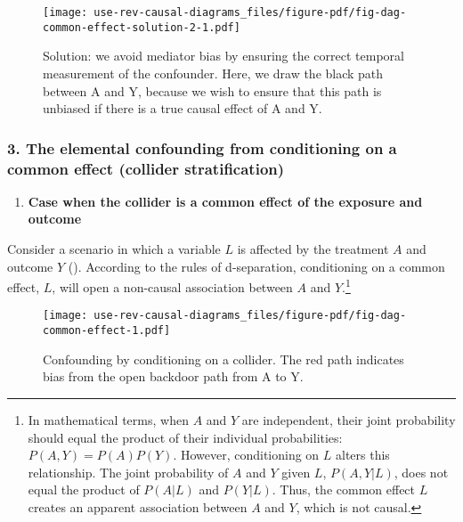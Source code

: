 \documentclass[
  singlecolumn,
  9pt]{article}
\providecommand{\tightlist}{%
  \setlength{\itemsep}{0pt}\setlength{\parskip}{0pt}}\usepackage{longtable,booktabs,array}
\begin{document}
\begin{figure}

{\centering \texttt{[image: use-rev-causal-diagrams\_files/figure-pdf/fig-dag-common-effect-solution-2-1.pdf]}

}

\caption{\label{fig-dag-common-effect-solution-2}Solution: we avoid
mediator bias by ensuring the correct temporal measurement of the
confounder. Here, we draw the black path between A and Y, because we
wish to ensure that this path is unbiased if there is a true causal
effect of A and Y.}

\end{figure}

\subsubsection{3. The elemental confounding from conditioning on a
common effect (collider
stratification)}\label{the-elemental-confounding-from-conditioning-on-a-common-effect-collider-stratification}

\begin{enumerate}
\def\labelenumi{\arabic{enumi}.}
\tightlist
\item
  \textbf{Case when the collider is a common effect of the exposure and
  outcome}
\end{enumerate}

Consider a scenario in which a variable \(L\) is affected by the
treatment \(A\) and outcome \(Y\) (). According to the rules of d-separation, conditioning on a
common effect, \(L\), will open a non-causal association between \(A\)
and \(Y\).\footnote{In mathematical terms, when \(A\) and \(Y\) are
  independent, their joint probability should equal the product of their
  individual probabilities: \(P(A, Y) = P(A)P(Y)\). However,
  conditioning on \(L\) alters this relationship. The joint probability
  of \(A\) and \(Y\) given \(L\), \(P(A, Y | L)\), does not equal the
  product of \(P(A | L)\) and \(P(Y | L)\). Thus, the common effect
  \(L\) creates an apparent association between \(A\) and \(Y\), which
  is not causal.}

\begin{figure}

{\centering \texttt{[image: use-rev-causal-diagrams\_files/figure-pdf/fig-dag-common-effect-1.pdf]}

}

\caption{\label{fig-dag-common-effect}Confounding by conditioning on a
collider. The red path indicates bias from the open backdoor path from A
to Y.}

\end{figure}
\end{document}
